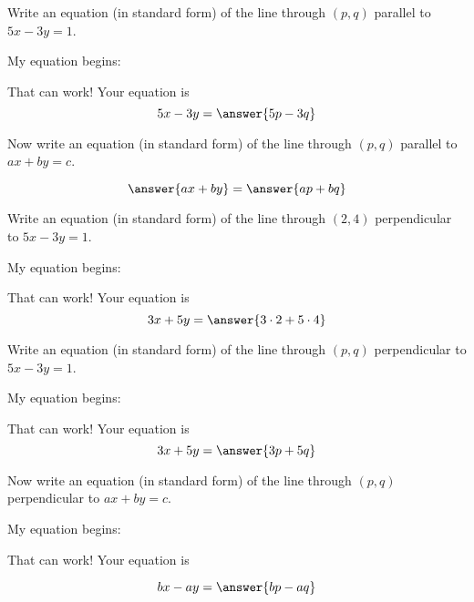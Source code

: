 \documentclass[nooutcomes]{ximera}
\begin{document}
\begin{problem}
Write an equation (in standard form) of the line through $(p,q)$ parallel to $5x-3y=1$.  

My equation begins: 
\begin{multipleChoice}
\end{multipleChoice}
\begin{problem}
That can work!  Your equation is
\[
5x-3y=\answer{5p-3q}
\]
\end{problem}
\end{problem}


\begin{problem}
Now write an equation (in standard form) of the line through $(p,q)$ parallel to $ax+by=c$. 

\begin{prompt}
\[
\answer{ax+by} = \answer{ap+bq}
\]
\end{prompt}
\end{problem}


\begin{problem}
Write an equation (in standard form) of the line through $(2,4)$ perpendicular to $5x-3y=1$.  

My equation begins: 
\begin{multipleChoice}
\end{multipleChoice}
\begin{problem}
That can work!  Your equation is
\[
3x+5y=\answer{3\cdot2+5\cdot4}
\]
\end{problem}
\end{problem}

\begin{problem}
Write an equation (in standard form) of the line through $(p,q)$ perpendicular to $5x-3y=1$.  

My equation begins: 
\begin{multipleChoice}
\end{multipleChoice}
\begin{problem}
That can work!  Your equation is
\[
3x+5y=\answer{3p+5q}
\]
\end{problem}
\end{problem}


\begin{problem}
Now write an equation (in standard form) of the line through $(p,q)$ perpendicular to $ax+by=c$. 

My equation begins: 
\begin{multipleChoice}
\end{multipleChoice}
\begin{problem}
That can work! Your equation is
\begin{prompt}
\[
bx-ay = \answer{bp-aq}
\]
\end{prompt}
\end{problem}
\end{problem}
\end{document}
